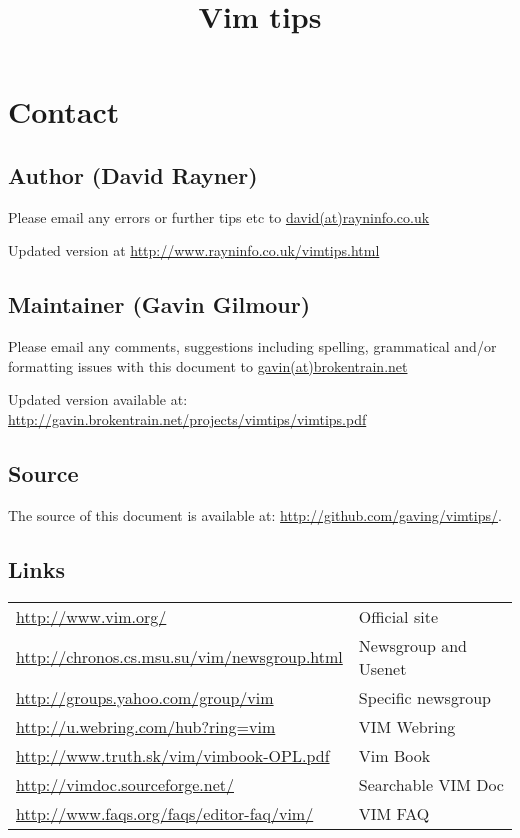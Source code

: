 \documentclass[10pt,landscape]{article}
\begin{document}
\title{Vim tips}

\maketitle
\tableofcontents
\newpage







\section{Contact}

\subsection{Author (David Rayner)}
Please email any errors or further tips etc to \href{mailto:david@rayninfo.co.uk}{david(at)rayninfo.co.uk}

Updated version at \url{http://www.rayninfo.co.uk/vimtips.html}

\subsection{Maintainer (Gavin Gilmour)}
Please email any comments, suggestions including spelling, grammatical and/or
formatting issues with this document to 
\href{mailto:gavin@brokentrain.net}{gavin(at)brokentrain.net}

Updated version available at: \url{http://gavin.brokentrain.net/projects/vimtips/vimtips.pdf}

\subsection{Source}
The source of this document is available at:
\url{http://github.com/gaving/vimtips/}.

\subsection{Links}
\begin{longtable}{l|l}
    \url{http://www.vim.org/} & Official site\\
    \url{http://chronos.cs.msu.su/vim/newsgroup.html} & Newsgroup and Usenet\\
    \url{http://groups.yahoo.com/group/vim} & Specific newsgroup\\
    \url{http://u.webring.com/hub?ring=vim} & VIM Webring\\
    \url{http://www.truth.sk/vim/vimbook-OPL.pdf} & Vim Book\\
    \url{http://vimdoc.sourceforge.net/} & Searchable VIM Doc\\
    \url{http://www.faqs.org/faqs/editor-faq/vim/} & VIM FAQ\\
\end{longtable}
\end{document}
